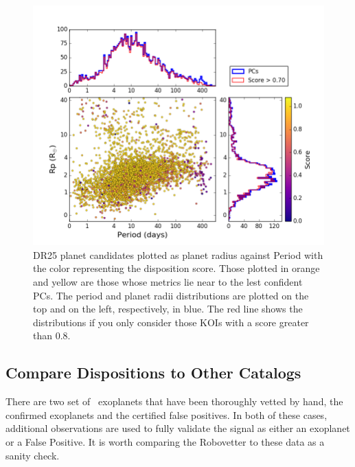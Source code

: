 \begin{figure}
    \centering
    \includegraphics[width=1.1\linewidth]{fig-radiusPeriodScore-hist.png}
    \caption{DR25 planet candidates plotted as planet radius against Period with the color representing the disposition score. Those plotted in orange and yellow are those whose metrics lie near to the lest confident PCs.  The period and planet radii distributions are plotted on the top and on the left, respectively, in blue. The red line shows the distributions if you only consider those KOIs with a score greater than 0.8. }
    \label{f:catalogPlot}
\end{figure}





\subsection{Compare Dispositions to Other Catalogs}
There are two set of \Kepler\ exoplanets that have been thoroughly vetted by hand, the confirmed exoplanets and the certified false positives.  In both of these cases, additional observations are used to fully validate the signal as either an exoplanet or a False Positive.  It is worth comparing the Robovetter to these data as a sanity check.  

